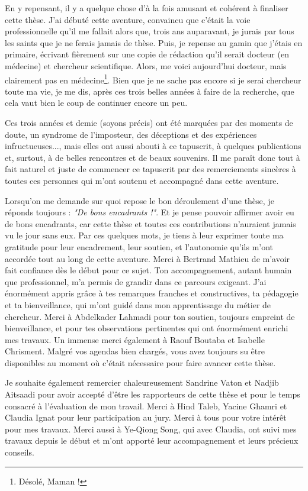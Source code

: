En y repensant, il y a quelque chose d'à la fois amusant et cohérent à finaliser cette thèse. J'ai débuté cette aventure, convaincu que c'était la voie professionnelle qu'il me fallait alors que, trois ans auparavant, je jurais par tous les saints que je ne ferais jamais de thèse. Puis, je repense au gamin que j'étais en primaire, écrivant fièrement sur une copie de rédaction qu'il serait docteur (en médecine) et chercheur scientifique. Alors, me voici aujourd'hui docteur, mais clairement pas en médecine\footnote{Désolé, Maman !}. Bien que je ne sache pas encore si je serai chercheur toute ma vie, je me dis, après ces trois belles années à faire de la recherche, que cela vaut bien le coup de continuer encore un peu.

Ces trois années et demie (soyons précis) ont été marquées par des moments de doute, un syndrome de l'imposteur, des déceptions et des expériences infructueuses..., mais elles ont aussi abouti à ce tapuscrit, à quelques publications et, surtout, à de belles rencontres et de beaux souvenirs. Il me paraît donc tout à fait naturel et juste de commencer ce tapuscrit par des remerciements sincères à toutes ces personnes qui m'ont soutenu et accompagné dans cette aventure.

Lorsqu'on me demande sur quoi repose le bon déroulement d'une thèse, je réponds toujours : \textit{"De bons encadrants !"}. Et je pense pouvoir affirmer avoir eu de bons encadrants, car cette thèse et toutes ces contributions n'auraient jamais vu le jour sans eux. Par ces quelques mots, je tiens à leur exprimer toute ma gratitude pour leur encadrement, leur soutien, et l'autonomie qu'ils m'ont accordée tout au long de cette aventure.  
Merci à Bertrand Mathieu de m'avoir fait confiance dès le début pour ce sujet. Ton accompagnement, autant humain que professionnel, m'a permis de grandir dans ce parcours exigeant. J'ai énormément appris grâce à tes remarques franches et constructives, ta pédagogie et ta bienveillance, qui m'ont guidé dans mon apprentissage du métier de chercheur. Merci à Abdelkader Lahmadi pour ton soutien, toujours empreint de bienveillance, et pour tes observations pertinentes qui ont énormément enrichi mes travaux. Un immense merci également à Raouf Boutaba et Isabelle Chrisment. Malgré vos agendas bien chargés, vous avez toujours su être disponibles au moment où c'était nécessaire pour faire avancer cette thèse.

Je souhaite également remercier chaleureusement Sandrine Vaton et Nadjib Aitsaadi pour avoir accepté d’être les rapporteurs de cette thèse et pour le temps consacré à l’évaluation de mon travail. Merci à Hind Taleb, Yacine Ghamri et Claudia Ignat pour leur participation au jury. Merci à tous pour votre intérêt pour mes travaux. Merci aussi à Ye-Qiong Song, qui avec Claudia, ont suivi mes travaux depuis le début et m’ont apporté leur accompagnement et leurs précieux conseils.


